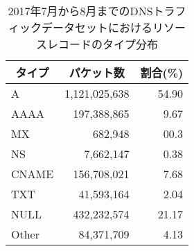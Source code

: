 \begin{table}[t]
 \caption[リソースレコードの分布]{2017年7月から8月までのDNSトラフィックデータセットにおけるリソースレコードのタイプ分布}
 \centering
  \begin{tabular}{lrr}
    \toprule
		\multicolumn{1}{c}{\textbf{タイプ}} & \multicolumn{1}{c}{\textbf{パケット数}} & \multicolumn{1}{c}{\textbf{割合(\%)}}\\
    \midrule
    A & 1,121,025,638 & 54.90\\
    AAAA & 197,388,865 & 9.67\\
    MX & 682,948 & 00.3\\
    NS & 7,662,147 & 0.38 \\
    CNAME & 156,708,021 & 7.68 \\
    TXT & 41,593,164 & 2.04 \\
    NULL & 432,232,574 & 21.17 \\
    Other & 84,371,709 & 4.13 \\
    \bottomrule
  \end{tabular}
 \label{tab:infil-rtype}
\end{table}

